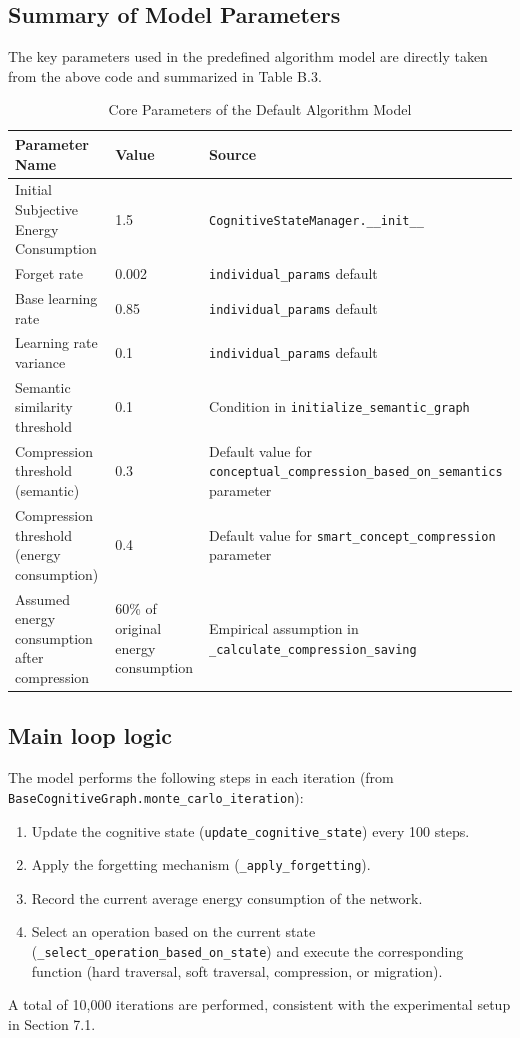 \documentclass[10pt,onecolumn]{article}
\begin{document}
\subsection{Summary of Model Parameters}
The key parameters used in the predefined algorithm model are directly taken from the above code and summarized in Table B.3.

\begin{table}[H]
\footnotesize
\centering
\caption{Core Parameters of the Default Algorithm Model}
\label{tab:preset_params}
\begin{tabular}{p{5cm}p{2.5cm}p{6cm}}
\toprule
\textbf{Parameter Name} & \textbf{Value} & \textbf{Source} \\
\midrule
Initial Subjective Energy Consumption & 1.5 & \texttt{CognitiveStateManager.\_\_init\_\_} \\
Forget rate & 0.002 & \texttt{individual\_params} default \\
Base learning rate & 0.85 & \texttt{individual\_params} default \\
Learning rate variance & 0.1 & \texttt{individual\_params} default \\
Semantic similarity threshold & 0.1 & Condition in \texttt{initialize\_semantic\_graph} \\
Compression threshold (semantic) & 0.3 & Default value for \texttt{conceptual\_compression\_based\_on\_semantics} parameter \\
Compression threshold (energy consumption) & 0.4 & Default value for \texttt{smart\_concept\_compression} parameter \\
Assumed energy consumption after compression & 60\% of original energy consumption & Empirical assumption in \texttt{\_calculate\_compression\_saving} \\
\bottomrule
\end{tabular}
\end{table}

\subsection{Main loop logic}
The model performs the following steps in each iteration (from \texttt{BaseCognitiveGraph.monte\_carlo\_iteration}):
\begin{enumerate}
    \item Update the cognitive state (\texttt{update\_cognitive\_state}) every 100 steps.
    \item Apply the forgetting mechanism (\texttt{\_apply\_forgetting}).
    \item Record the current average energy consumption of the network.
    \item Select an operation based on the current state (\texttt{\_select\_operation\_based\_on\_state}) and execute the corresponding function (hard traversal, soft traversal, compression, or migration).
\end{enumerate}
A total of 10,000 iterations are performed, consistent with the experimental setup in Section 7.1.
\end{document}
